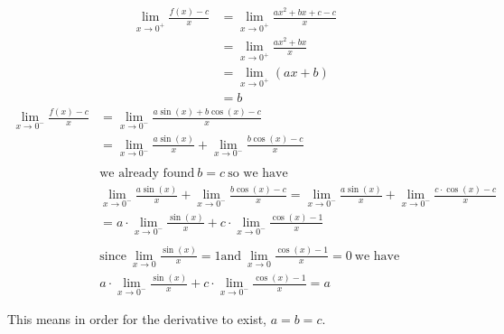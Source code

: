 \documentclass[nooutcomes]{ximera}
\begin{document}
\begin{problem}
\begin{freeResponse}
		\begin{align*}
		\lim_{x\to 0^+} \frac{f(x)-c}{x}&=\lim_{x\to 0^+} \frac{ax^2+bx+c-c}{x}\\
		&=\lim_{x\to 0^+} \frac{ax^2+bx}{x}\\
		&=\lim_{x\to 0^+} (ax+b)\\
		&=b
		\end{align*}
		\begin{align*}
		\lim_{x\to 0^-} \frac{f(x)-c}{x}&=\lim_{x\to 0^-} \frac{a \sin(x)+b \cos(x)-c}{x}\\
		&=\lim_{x\to 0^-} \frac{a \sin(x)}{x}+\lim_{x\to 0^-} \frac{b\cos(x)-c}{x}\\ \\
		& \text{we already found}\ b=c \ \text{so we have}\\
		&\lim_{x\to 0^-} \frac{a \sin(x)}{x}+\lim_{x\to 0^-} \frac{b \cos(x)-c}{x}=\lim_{x\to 0^-} \frac{a \sin(x)}{x}+\lim_{x\to 0^-} \frac{c\cdot \cos(x)-c}{x}\\
		&=a\cdot \lim_{x\to 0^-} \frac{ \sin(x)}{x}+c \cdot \lim_{x\to 0^-} \frac{\cos(x)-1}{x}\\ \\
		& \text{since}\ \lim_{x\to 0} \frac{\sin(x)}{x}=1 \text{and}\  \lim_{x\to 0} \frac{\cos(x)-1}{x}=0 \ \text{we have}\\
		&a\cdot \lim_{x\to 0^-} \frac{\sin(x)}{x}+c \cdot \lim_{x\to 0^-} \frac{\cos(x)-1}{x}=a
		\end{align*}

		This means in order for the derivative to exist, $a=b=c$.
		\end{freeResponse}
\end{problem}	
\end{document}
